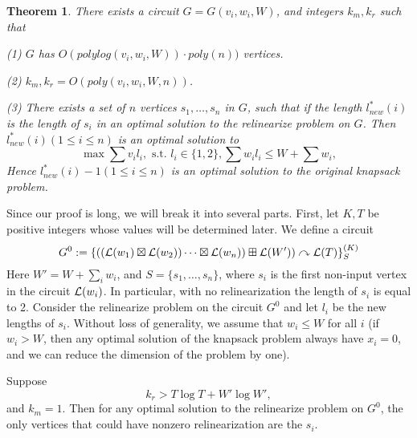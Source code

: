 \documentclass[11pt]{article} %
\theoremstyle{plain}
\newtheorem{theorem}{Theorem}
\theoremstyle{definition}
\begin{document}
\iffalse
{\color{red} Hao: one SODA reviewer pointed out a mistake. I think I can fix it by letting 
$M := W + \sum w_i + \sum_i v_i$. Take $T = 2M\log M$, $k_r = 6 M \log M \log(M \log M)$, and $K = 4 \log(M \log M)$. 
In this case, $K$ is still logarithm in the $v_i$ and $W$'s. We can verify that $KT > k_r$, $k_r > T\log T + W' \log W'$. Moreover, we have $Kr_i - k_r \leq 4 \log(M \log M) M \log M - k_r \leq -2 M \log M \log(M\log M) < -M < v_i$, for all $i$. So in the proof we don't have to scale up $K$.}
\fi
\begin{theorem} \label{thm}
There exists a circuit $G = G(v_i, w_i, W)$, and integers $k_m, k_r$ such that 

(1) $G$ has  $O(polylog(v_i, w_i, W) ) \cdot poly(n))$ vertices. 

(2) $k_m, k_r = O( poly(v_i, w_i, W, n))$. 

(3) There exists a set of $n$ vertices $s_1, \ldots, s_n$ in $G$, such that if the length $l_{new}^*(i)$ is the length of $s_i$ in an optimal solution to the relinearize problem on $G$. Then $l_{new}^*(i) (1 \leq i \leq n)$ is an optimal solution to 
\[
\max \sum v_i l_i,  \mbox{ s.t. }  l_i \in \{1, 2\}, \sum w_i l_i \leq W + \sum w_i, 
\]
Hence $l_{new}^*(i) -1 (1 \leq i \leq n)$ is an optimal  solution to the original knapsack problem. 
\end{theorem}
 
  
 
Since our proof is long, we will break it into several parts. First, let $K, T$ be positive integers whose values will be determined later. We  define a circuit 
 \[
 	G^{0}:= \{ ((\mathcal{L}(w_1) \boxtimes \mathcal{L}(w_2) ) \cdots \boxtimes \mathcal{L}(w_n) ) \boxplus \mathcal{L}(W') ) \curvearrowright \mathcal{L}(T) \}_S ^{(K)}
 \]
Here $W' = W + \sum_i w_i$, and $S = \{s_1, \ldots, s_n\}$, where $s_i$ is the first non-input vertex in the circuit $\mathcal{L}(w_i)$. In particular, with no relinearization the length of $s_i$ is equal to 2. Consider the relinearize problem on the circuit $G^0$ and let $l_i$ be the new lengths of $s_i$. Without loss of generality,  we assume that $w_i \leq W$ for all $i$ (if $w_i> W$,  then  any optimal solution of the knapsack problem always have $x_i = 0$, and we can reduce the dimension of the problem by one). 

\begin{lemma} \label{lem: constraint}
Suppose $$k_r > T\log T +W' \log W',$$  and $k_m =1$. Then for any optimal solution to the relinearize problem on $G^0$, the only vertices that could have nonzero relinearization are the $s_i$. 
\end{lemma}
\end{document}
